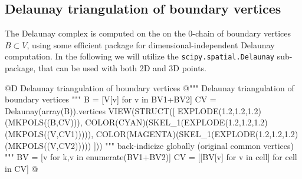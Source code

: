 \documentclass[11pt,oneside]{article}	%
\begin{document}
\subsection{Delaunay triangulation of boundary vertices}

The Delaunay complex is computed on the on the 0-chain of boundary vertices $B\subset V$, using some efficient package for dimensional-independent Delaunay computation. In the following  we will utilize the \texttt{scipy.spatial.Delaunay} sub-package, that can be used with both 2D and 3D points. 

@D Delaunay triangulation of boundary vertices
@{""" Delaunay triangulation of boundary vertices """
B = [V[v] for v in BV1+BV2]
CV = Delaunay(array(B)).vertices
VIEW(STRUCT([
	EXPLODE(1.2,1.2,1.2)(MKPOLS((B,CV))),
	COLOR(CYAN)(SKEL_1(EXPLODE(1.2,1.2,1.2)(MKPOLS((V,CV1))))),
	COLOR(MAGENTA)(SKEL_1(EXPLODE(1.2,1.2,1.2)(MKPOLS((V,CV2)))))
]))
""" back-indicize globally (original common vertices) """
BV = [v for k,v in enumerate(BV1+BV2)]
CV = [[BV[v] for v in cell] for cell in CV]
@}
\end{document}
